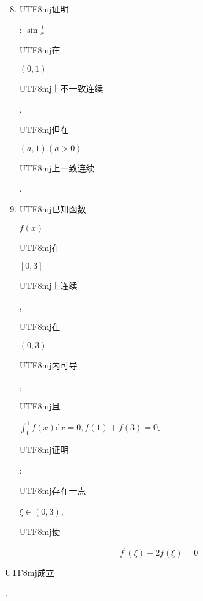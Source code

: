 \documentclass[10pt]{article}
\begin{document}
\begin{enumerate}
  \setcounter{enumi}{7}
  \item \begin{CJK}{UTF8}{mj}证明\end{CJK}: $\sin \frac{1}{x}$ \begin{CJK}{UTF8}{mj}在\end{CJK} $(0,1)$ \begin{CJK}{UTF8}{mj}上不一致连续\end{CJK}, \begin{CJK}{UTF8}{mj}但在\end{CJK} $(a, 1)(a>0)$ \begin{CJK}{UTF8}{mj}上一致连续\end{CJK}.

  \item \begin{CJK}{UTF8}{mj}已知函数\end{CJK} $f(x)$ \begin{CJK}{UTF8}{mj}在\end{CJK} $[0,3]$ \begin{CJK}{UTF8}{mj}上连续\end{CJK}, \begin{CJK}{UTF8}{mj}在\end{CJK} $(0,3)$ \begin{CJK}{UTF8}{mj}内可导\end{CJK}, \begin{CJK}{UTF8}{mj}且\end{CJK} $\int_{0}^{1} f(x) \mathrm{d} x=0, f(1)+f(3)=0$. \begin{CJK}{UTF8}{mj}证明\end{CJK}: \begin{CJK}{UTF8}{mj}存在一点\end{CJK} $\xi \in(0,3)$, \begin{CJK}{UTF8}{mj}使\end{CJK}

\end{enumerate}
$$
f^{\prime}(\xi)+2 f(\xi)=0
$$
\begin{CJK}{UTF8}{mj}成立\end{CJK}.
\end{document}

